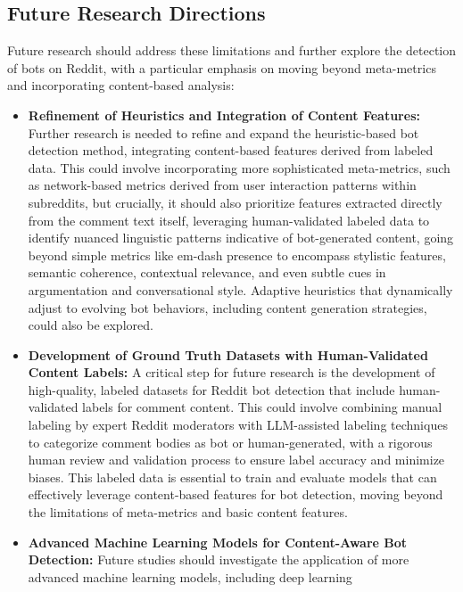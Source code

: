 \documentclass[
  12pt,
  letterpaper,
  DIV=11,
  numbers=noendperiod]{scrartcl}
\begin{document}
\subsection{Future Research
Directions}\label{future-research-directions}

Future research should address these limitations and further explore the
detection of bots on Reddit, with a particular emphasis on moving beyond
meta-metrics and incorporating content-based analysis:

\begin{itemize}
\item
  \textbf{Refinement of Heuristics and Integration of Content Features:}
  Further research is needed to refine and expand the heuristic-based
  bot detection method, integrating content-based features derived from
  labeled data. This could involve incorporating more sophisticated
  meta-metrics, such as network-based metrics derived from user
  interaction patterns within subreddits, but crucially, it should also
  prioritize features extracted directly from the comment text itself,
  leveraging human-validated labeled data to identify nuanced linguistic
  patterns indicative of bot-generated content, going beyond simple
  metrics like em-dash presence to encompass stylistic features,
  semantic coherence, contextual relevance, and even subtle cues in
  argumentation and conversational style. Adaptive heuristics that
  dynamically adjust to evolving bot behaviors, including content
  generation strategies, could also be explored.
\item
  \textbf{Development of Ground Truth Datasets with Human-Validated
  Content Labels:} A critical step for future research is the
  development of high-quality, labeled datasets for Reddit bot detection
  that include human-validated labels for comment content. This could
  involve combining manual labeling by expert Reddit moderators with
  LLM-assisted labeling techniques to categorize comment bodies as bot
  or human-generated, with a rigorous human review and validation
  process to ensure label accuracy and minimize biases. This labeled
  data is essential to train and evaluate models that can effectively
  leverage content-based features for bot detection, moving beyond the
  limitations of meta-metrics and basic content features.
\item
  \textbf{Advanced Machine Learning Models for Content-Aware Bot
  Detection:} Future studies should investigate the application of more
  advanced machine learning models, including deep learning

\end{itemize}
\end{document}
